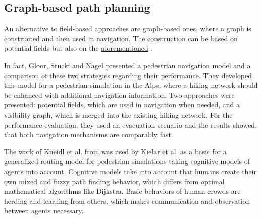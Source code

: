 	\subsection{Graph-based path planning}
	
		An alternative to field-based approaches are graph-based ones, where a graph is constructed and then used in navigation.
		The construction can be based on potential fields but also on the \hyperref[subsec:related-work:visibility-graph]{aforementioned} .
		
		In fact, Gloor, Stucki and Nagel presented a pedestrian navigation model and a comparison of these two strategies regarding their performance\cite{gloor-hybrid-pedestrian-routing}.
		They developed this model for a pedestrian simulation in the Alps, where a hiking network should be enhanced with additional navigation information.
		Two approaches were presented:
		potential fields, which are used in navigation when needed, and a visibility graph, which is merged into the existing hiking network.
		For the performance evaluation, they used an evacuation scenario and the results showed, that both navigation mechanisms are comparably fast.
		
		The work of Kneidl et al. from  was used by Kielar et al. as a basis for a generalized routing model for pedestrian simulations\cite{kielar-unified-pedestrian-routing} taking cognitive models of agents into account.
		Cognitive models take into account that humans create their own mixed and fuzzy path finding behavior, which differs from optimal mathematical algorithms like Dijkstra.
		Basic behaviors of human crowds are herding and learning from others, which makes communication and observation between agents necessary.
		
		